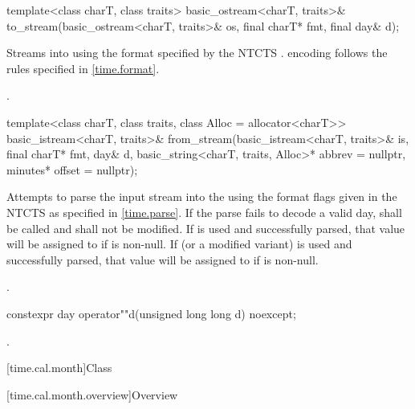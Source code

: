 %
\begin{itemdecl}
template<class charT, class traits>
  basic_ostream<charT, traits>&
    to_stream(basic_ostream<charT, traits>& os, final charT* fmt, final day& d);
\end{itemdecl}

\begin{itemdescr}
\pnum
\effects
Streams  into  using
the format specified by the NTCTS .
 encoding follows the rules specified in \ref{time.format}.

\pnum
\returns {}.
\end{itemdescr}

%
\begin{itemdecl}
template<class charT, class traits, class Alloc = allocator<charT>>
  basic_istream<charT, traits>&
    from_stream(basic_istream<charT, traits>& is, final charT* fmt,
                day& d, basic_string<charT, traits, Alloc>* abbrev = nullptr,
                minutes* offset = nullptr);
\end{itemdecl}

\begin{itemdescr}
\pnum
\effects
Attempts to parse the input stream 
into the   using
the format flags given in the NTCTS 
as specified in \ref{time.parse}.
If the parse fails to decode a valid day,
 shall be called
and  shall not be modified.
If  is used and successfully parsed,
that value will be assigned to  if  is non-null.
If  (or a modified variant) is used and successfully parsed,
that value will be assigned to  if  is non-null.

\pnum
\returns {}.
\end{itemdescr}

%
\begin{itemdecl}
constexpr day operator""d(unsigned long long d) noexcept;
\end{itemdecl}

\begin{itemdescr}
\pnum
\returns {}.
\end{itemdescr}

[time.cal.month]{Class }

[time.cal.month.overview]{Overview}

